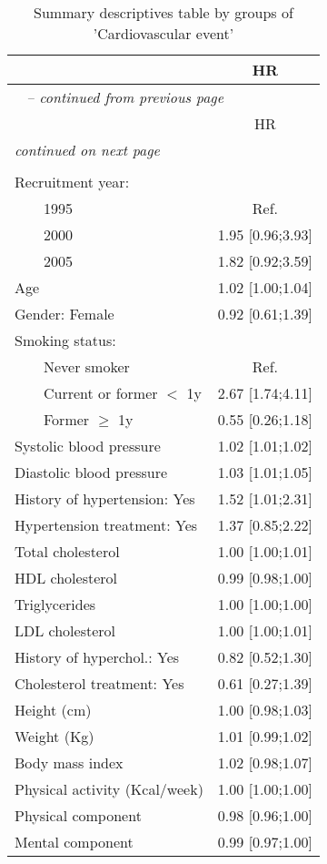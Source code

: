 
    \begin{longtable}{lc} 
    \caption{Summary descriptives table by groups of 'Cardiovascular event'}\\
    \hline  
     &        HR        \\ 
  
    \hline
    \hline     
    \endfirsthead 
    \multicolumn{2}{l}{\tablename\ \thetable{} \textit{-- continued from previous page}}\\ 
    \hline
     &        HR        \\ 

    \hline
    \hline  
    \endhead   
    \hline
    \multicolumn{2}{l}{\textit{continued on next page}} \\ 
    \endfoot   
    \multicolumn{2}{l}{}  \\ 
    \endlastfoot 
    Recruitment year: &                 \\ 
$\qquad$1995 &       Ref.      \\ 
$\qquad$2000 & 1.95 [0.96;3.93]\\ 
$\qquad$2005 & 1.82 [0.92;3.59]\\ 
Age & 1.02 [1.00;1.04]\\ 
Gender: Female & 0.92 [0.61;1.39]\\ 
Smoking status: &                 \\ 
$\qquad$Never smoker &       Ref.      \\ 
$\qquad$Current or former $<$ 1y & 2.67 [1.74;4.11]\\ 
$\qquad$Former $\geq$ 1y & 0.55 [0.26;1.18]\\ 
Systolic blood pressure & 1.02 [1.01;1.02]\\ 
Diastolic blood pressure & 1.03 [1.01;1.05]\\ 
History of hypertension: Yes & 1.52 [1.01;2.31]\\ 
Hypertension treatment: Yes & 1.37 [0.85;2.22]\\ 
Total cholesterol & 1.00 [1.00;1.01]\\ 
HDL cholesterol & 0.99 [0.98;1.00]\\ 
Triglycerides & 1.00 [1.00;1.00]\\ 
LDL cholesterol & 1.00 [1.00;1.01]\\ 
History of hyperchol.: Yes & 0.82 [0.52;1.30]\\ 
Cholesterol treatment: Yes & 0.61 [0.27;1.39]\\ 
Height (cm) & 1.00 [0.98;1.03]\\ 
Weight (Kg) & 1.01 [0.99;1.02]\\ 
Body mass index & 1.02 [0.98;1.07]\\ 
Physical activity (Kcal/week) & 1.00 [1.00;1.00]\\ 
Physical component & 0.98 [0.96;1.00]\\ 
Mental component & 0.99 [0.97;1.00] \\ 
 
    \hline
    
    \end{longtable}
